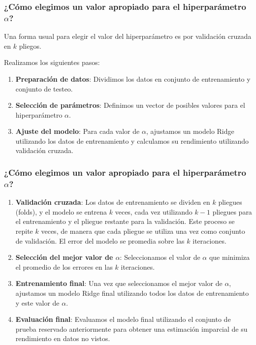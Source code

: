 \documentclass[aspectratio=169,12pt]{beamer}
\begin{document}
\begin{frame}
\frametitle{¿Cómo elegimos un valor apropiado para el hiperparámetro $\alpha$?}

Una forma usual para elegir el valor del hiperparámetro es por validación cruzada en $k$ pliegos.

Realizamos los siguientes pasos:

\begin{enumerate}
\item \textbf{Preparación de datos}: Dividimos los datos en conjunto de entrenamiento y conjunto de testeo.

\item \textbf{Selección de parámetros}: Definimos un vector de posibles valores para el hiperparámetro $\alpha$.

\item \textbf{Ajuste del modelo}: Para cada valor de $\alpha$, ajustamos un modelo Ridge utilizando los datos de entrenamiento y calculamos su rendimiento utilizando validación cruzada.
\label{end-enumerate}%
\end{enumerate}
\end{frame}

\begin{frame}
\frametitle{¿Cómo elegimos un valor apropiado para el hiperparámetro $\alpha$?}

\begin{enumerate}
\item \textbf{Validación cruzada}: Los datos de entrenamiento se dividen en $k$ pliegues (folds), y el modelo se entrena $k$ veces, cada vez utilizando $k-1$ pliegues para el entrenamiento y el pliegue restante para la validación. Este proceso se repite $k$ veces, de manera que cada pliegue se utiliza una vez como conjunto de validación. El error del modelo se promedia sobre las $k$ iteraciones.

\item \textbf{Selección del mejor valor de $\alpha$}: Seleccionamos el valor de $\alpha$ que minimiza el promedio de los errores en las $k$ iteraciones.

\item \textbf{Entrenamiento final}: Una vez que seleccionamos el mejor valor de $\alpha$, ajustamos un modelo Ridge final utilizando todos los datos de entrenamiento y este valor de $\alpha$.

\item \textbf{Evaluación final}: Evaluamos el modelo final utilizando el conjunto de prueba reservado anteriormente para obtener una estimación imparcial de su rendimiento en datos no vistos.
\end{enumerate}
\end{frame}
\end{document}
